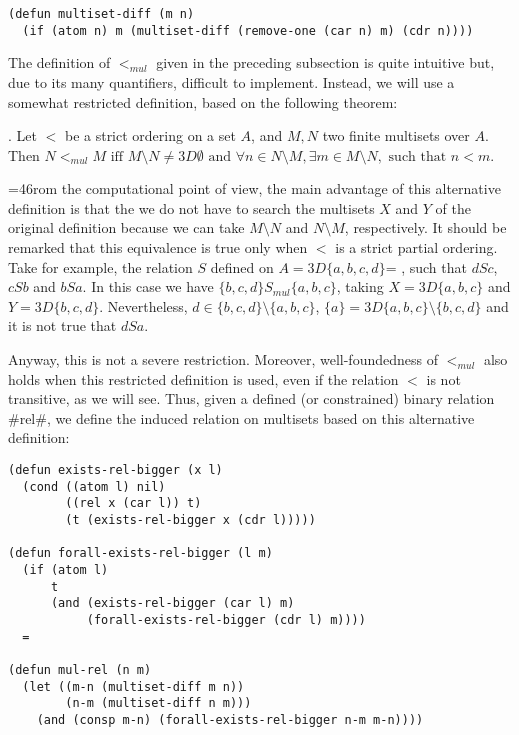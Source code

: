 \documentclass[11pt]{llncs}
\begin{document}
{\begin{verbatim}
(defun multiset-diff (m n)
  (if (atom n) m (multiset-diff (remove-one (car n) m) (cdr n))))
\end{verbatim}

The definition of $<_{mul}$ given in the preceding subsection is quite
intuitive but, due to its many quantifiers, difficult to
implement. Instead, we will use a somewhat restricted definition, based
on the following theorem:

\vspace{0.1cm}

. Let $<$ be a strict ordering on a set $A$, and
$M,N$ two finite multisets over $A$. Then $N<_{mul} M \mbox{ iff }
M\setminus N\not=3D\emptyset \mbox{ and } \forall n\in N\setminus M,
\exists m\in M \setminus N, \mbox{ such that } n<m$.

\vspace{0.1cm}

=46rom the computational point of view, the main advantage of this
alternative definition is that the we do not have to search  the
multisets $X$ and $Y$ of the original definition because we can take
$M\setminus N$ and $N\setminus M$, respectively. It should be remarked
that this equivalence is true only when $<$ is a strict partial
ordering. Take for example, the relation $S$ defined on $A=3D\{a,b,c,d\}$=
,
such that $dSc$, $cSb$ and $bSa$. In this case we have $\{b,c,d\}
S_{mul} \{a,b,c\}$, taking $X=3D\{a,b,c\}$ and
$Y=3D\{b,c,d\}$. Nevertheless, $d\in \{b,c,d\}\setminus\{a,b,c\}$,
$\{a\}=3D\{a,b,c\}\setminus\{b,c,d\}$ and it is not true that $dSa$.

Anyway, this is not a severe restriction. Moreover, well-foundedness of
$<_{mul}$ also holds  when this restricted definition is used, even if
the relation $<$ is not transitive, as we will see. Thus, given a
defined (or constrained) binary relation #rel#, we define the induced
relation on multisets based on this alternative definition:

\label{ACL2-mul-rel}

\begin{verbatim}
(defun exists-rel-bigger (x l)
  (cond ((atom l) nil)
        ((rel x (car l)) t)
        (t (exists-rel-bigger x (cdr l)))))

(defun forall-exists-rel-bigger (l m)
  (if (atom l)
      t
      (and (exists-rel-bigger (car l) m)
           (forall-exists-rel-bigger (cdr l) m))))
  =

(defun mul-rel (n m)
  (let ((m-n (multiset-diff m n))
        (n-m (multiset-diff n m)))
    (and (consp m-n) (forall-exists-rel-bigger n-m m-n))))
\end{verbatim}


}
\end{document}
